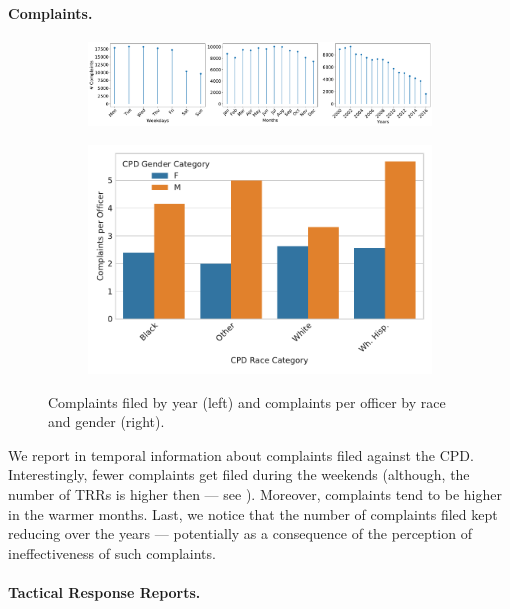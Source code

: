\paragraph{Complaints.} 
\begin{figure}[h] 
\begin{subfigure}{0.44\textwidth}
	\includegraphics[width=\textwidth, clip, trim= 970 0 0 0]{figs/complaints_times} 
\end{subfigure}
\begin{subfigure}{0.52\textwidth}
	\includegraphics[width=\textwidth]{figs/complaints} 
\end{subfigure}
	\caption{Complaints filed by year (left) and complaints per officer by race and gender (right).} \label{fig:complaints}
\end{figure}

We report in  temporal information about complaints filed against the CPD. Interestingly, fewer complaints get filed during the weekends (although, the number of TRRs is higher then --- see ). Moreover, complaints tend to be higher in the warmer months. Last, we notice that the number of complaints filed kept reducing over the years --- potentially as a consequence of the perception of ineffectiveness of such complaints.

\paragraph{Tactical Response Reports.}

